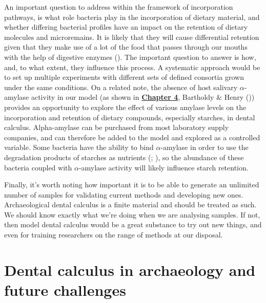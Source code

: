 \documentclass[
  b5paper,
]{book}
\begin{document}
An important question to address within the framework of incorporation
pathways, is what role bacteria play in the incorporation of dietary
material, and whether differing bacterial profiles have an impact on the
retention of dietary molecules and microremains. It is likely that they
will cause differential retention given that they make use of a lot of
the food that passes through our mouths with the help of digestive
enzymes (). The important question to answer is how, and, to what extent,
they influence this process. A systematic approach would be to set up
multiple experiments with different sets of defined consortia grown
under the same conditions. On a related note, the absence of host
salivary \(\alpha\)-amylase activity in our model (as shown in
\hyperref[byoc-starch]{\textbf{Chapter 4}}, Bartholdy \& Henry
()) provides an
opportunity to explore the effect of various amylase levels on the
incorporation and retention of dietary compounds, especially starches,
in dental calculus. Alpha-amylase can be purchased from most laboratory
supply companies, and can therefore be added to the model and explored
as a controlled variable. Some bacteria have the ability to bind
\(\alpha\)-amylase in order to use the degradation products of starches
as nutrients (; ),
so the abundance of these bacteria coupled with \(\alpha\)-amylase
activity will likely influence starch retention.

Finally, it's worth noting how important it is to be able to generate an
unlimited number of samples for validating current methods and
developing new ones. Archaeological dental calculus is a finite material
and should be treated as such. We should know exactly what we're doing
when we are analysing samples. If not, then model dental calculus would
be a great substance to try out new things, and even for training
researchers on the range of methods at our disposal.

\section{Dental calculus in archaeology and future
challenges}\label{dental-calculus-in-archaeology-and-future-challenges}
\end{document}
